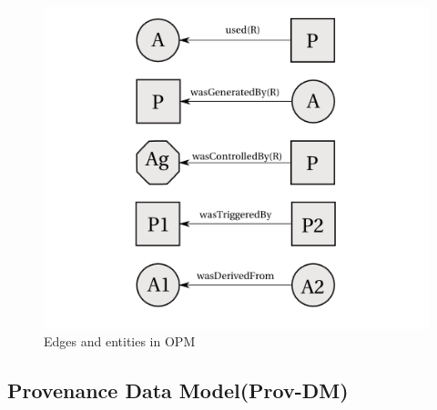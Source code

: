 \begin{figure}[h]
\begin{center}

\includegraphics{opm_convention.PNG}
\end{center}
\caption{Edges and entities in OPM}
\label{autom}
\end{figure}


\subsection{Provenance Data Model(Prov-DM)}

